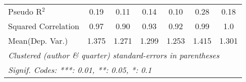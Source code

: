 \begin{tabular}{lcccccc}
   Pseudo R$^2$                                               & 0.19    & 0.11    & 0.14    & 0.10    & 0.28          & 0.18\\  
   Squared Correlation                                        & 0.97    & 0.90    & 0.93    & 0.92    & 0.99          & 1.0\\  
Mean(Dep. Var.) & 1.375 & 1.271 & 1.299 & 1.253 & 1.415 & 1.301 \\
   \midrule \midrule
   \multicolumn{7}{l}{\emph{Clustered (author \& quarter) standard-errors in parentheses}}\\
   \multicolumn{7}{l}{\emph{Signif. Codes: ***: 0.01, **: 0.05, *: 0.1}}\\
\end{tabular}
\par\endgroup
